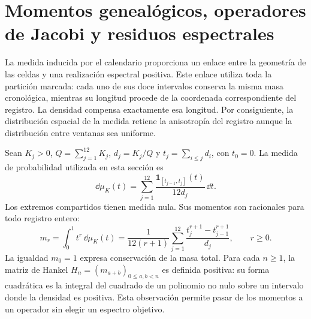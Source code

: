 \section{Momentos genealógicos, operadores de Jacobi y residuos espectrales}
\label{sec:jacobi-generated}

La medida inducida por el calendario proporciona un enlace entre la
geometría de las celdas y una realización espectral positiva. Este enlace
utiliza toda la partición marcada: cada uno de sus doce intervalos conserva
la misma masa cronológica, mientras su longitud procede de la coordenada
correspondiente del registro. La densidad compensa exactamente esa
longitud. Por consiguiente, la distribución espacial de la medida retiene
la anisotropía del registro aunque la distribución entre ventanas sea
uniforme.

Sean \(K_j>0\), \(Q=\sum_{j=1}^{12}K_j\), \(d_j=K_j/Q\) y
\(t_j=\sum_{i\leq j}d_i\), con \(t_0=0\). La medida de probabilidad
utilizada en esta sección es
\[
 \dd\mu_K(t)=\sum_{j=1}^{12}
 \frac{\mathbf1_{[t_{j-1},t_j]}(t)}{12d_j}\,\dd t.
\]
Los extremos compartidos tienen medida nula. Sus momentos son racionales
para todo registro entero:
\begin{equation}
 m_r=\int_0^1t^r\,\dd\mu_K(t)
 =\frac1{12(r+1)}\sum_{j=1}^{12}
   \frac{t_j^{r+1}-t_{j-1}^{r+1}}{d_j},\qquad r\geq0.
 \label{eq:jacobi-moments}
\end{equation}
La igualdad \(m_0=1\) expresa conservación de la masa total. Para cada
\(n\geq1\), la matriz de Hankel \(H_n=(m_{a+b})_{0\leq a,b<n}\)
es definida positiva: su forma cuadrática es la integral del cuadrado
de un polinomio no nulo sobre un intervalo donde la densidad es positiva.
Esta observación permite pasar de los momentos a un operador sin elegir
un espectro objetivo.

